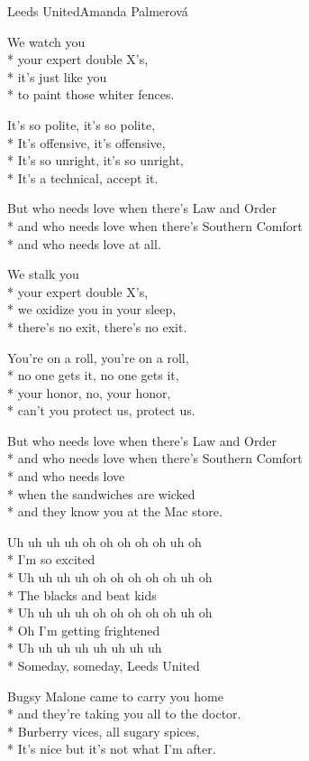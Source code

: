\documentclass[10.5pt]{book}
\begin{document}
\begin{poem}{Leeds United}{Amanda Palmerová}

\settowidth{\versewidth}{He’s free to tread and lift the sheets}

We watch you\\*
your expert double X's,\\*
it's just like you\\*
to paint those whiter fences.

It's so polite, it's so polite,\\*
It's offensive, it's offensive,\\*
It's so unright, it's so unright,\\*
It's a technical, accept it.

But who needs love when there's Law and Order\\*
and who needs love when there's Southern Comfort\\*
and who needs love at all.

We stalk you\\*
your expert double X's,\\*
we oxidize you in your sleep,\\*
there's no exit, there's no exit.

You're on a roll, you're on a roll,\\*
no one gets it, no one gets it,\\*
your honor, no, your honor,\\*
can't you protect us, protect us.

But who needs love when there's Law and Order\\*
and who needs love when there's Southern Comfort\\*
and who needs love\\*
when the sandwiches are wicked\\*
and they know you at the Mac store.

Uh uh uh uh oh oh oh oh oh uh oh\\*
I'm so excited\\*
Uh uh uh uh oh oh oh oh oh uh oh\\*
The blacks and beat kids\\*
Uh uh uh uh oh oh oh oh oh uh oh\\*
Oh I'm getting frightened\\*
Uh uh uh uh uh uh uh uh\\*
Someday, someday, Leeds United

Bugsy Malone came to carry you home\\*
and they're taking you all to the doctor.\\*
Burberry vices, all sugary spices,\\*
It's nice but it's not what I'm after.


\end{poem}
\end{document}
